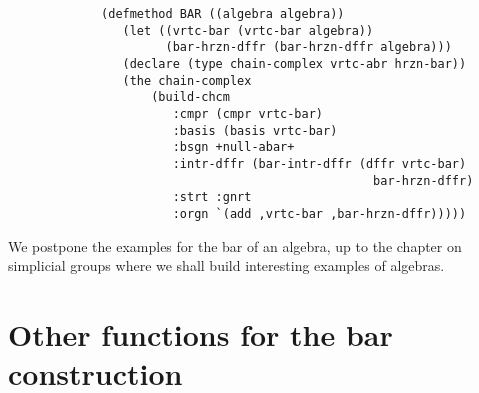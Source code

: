 {\footnotesize\begin{verbatim}
             (defmethod BAR ((algebra algebra))
                (let ((vrtc-bar (vrtc-bar algebra))
                      (bar-hrzn-dffr (bar-hrzn-dffr algebra)))
                (declare (type chain-complex vrtc-abr hrzn-bar))
                (the chain-complex
                    (build-chcm
                       :cmpr (cmpr vrtc-bar)
                       :basis (basis vrtc-bar)
                       :bsgn +null-abar+
                       :intr-dffr (bar-intr-dffr (dffr vrtc-bar) 
                                                   bar-hrzn-dffr)
                       :strt :gnrt
                       :orgn `(add ,vrtc-bar ,bar-hrzn-dffr)))))
\end{verbatim}}
We postpone the examples for the bar of an algebra, up to the chapter on
simplicial groups where we shall  build interesting examples of algebras.


\newpage

\section {Other functions for the bar construction} 

